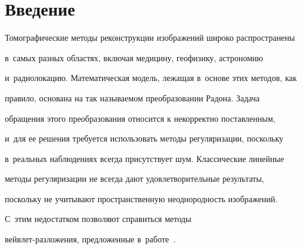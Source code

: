 

















 \thispagestyle{headings}


 


 \vspace*{-12pt}











\section{Введение}





Томографические методы реконструкции изображений широко распространены 


в~самых разных областях, включая медицину, геофизику, астрономию 


и~радиолокацию. Математическая модель, лежащая в~основе этих методов, как 


правило, основана на так называемом преобразовании Радона. Задача 


обращения этого преобразования относится к некорректно поставленным, 


и~для ее решения требуется использовать методы регуляризации, поскольку 


в~реальных наблюдениях всегда присутствует шум. Классические линейные 


методы регуляризации не всегда дают удовлетворительные результаты, 


поскольку не учитывают пространственную неоднородность изображений. 


С~этим недостатком позволяют справиться методы  


вейв\-лет-раз\-ло\-же\-ния, предложенные в~работе~\cite{Don95}. 


